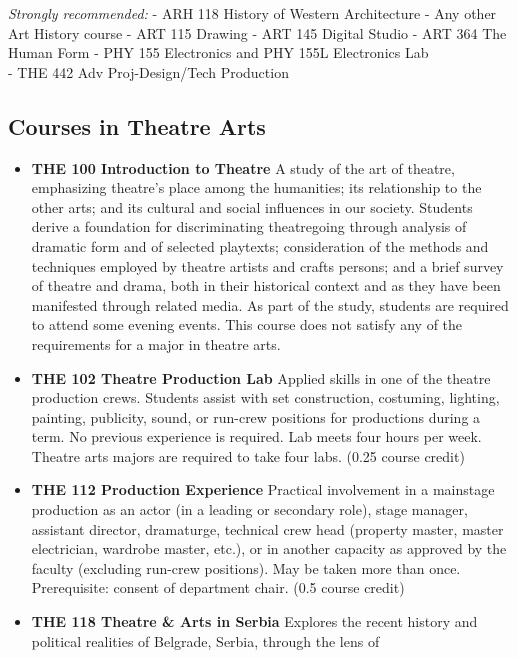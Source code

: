 \documentclass[
  letterpaper,
]{scrbook}
\providecommand{\tightlist}{%
  \setlength{\itemsep}{0pt}\setlength{\parskip}{0pt}}
\begin{document}
\emph{Strongly recommended:} - ARH 118 History of Western Architecture -
Any other Art History course - ART 115 Drawing - ART 145 Digital Studio
- ART 364 The Human Form - PHY 155 Electronics and PHY 155L Electronics
Lab\\
- THE 442 Adv Proj-Design/Tech Production

\subsection{Courses in Theatre Arts}\label{courses-in-theatre-arts}

\begin{itemize}
\tightlist
\item
  \textbf{THE 100 Introduction to Theatre} A study of the art of
  theatre, emphasizing theatre's place among the humanities; its
  relationship to the other arts; and its cultural and social influences
  in our society. Students derive a foundation for discriminating
  theatregoing through analysis of dramatic form and of selected
  playtexts; consideration of the methods and techniques employed by
  theatre artists and crafts persons; and a brief survey of theatre and
  drama, both in their historical context and as they have been
  manifested through related media. As part of the study, students are
  required to attend some evening events. This course does not satisfy
  any of the requirements for a major in theatre arts.\\
\item
  \textbf{THE 102 Theatre Production Lab} Applied skills in one of the
  theatre production crews. Students assist with set construction,
  costuming, lighting, painting, publicity, sound, or run-crew positions
  for productions during a term. No previous experience is required. Lab
  meets four hours per week. Theatre arts majors are required to take
  four labs. (0.25 course credit)
\item
  \textbf{THE 112 Production Experience} Practical involvement in a
  mainstage production as an actor (in a leading or secondary role),
  stage manager, assistant director, dramaturge, technical crew head
  (property master, master electrician, wardrobe master, etc.), or in
  another capacity as approved by the faculty (excluding run-crew
  positions). May be taken more than once. Prerequisite: consent of
  department chair. (0.5 course credit)\\
\item
  \textbf{THE 118 Theatre \& Arts in Serbia} Explores the recent history
  and political realities of Belgrade, Serbia, through the lens of

\end{itemize}
\end{document}
